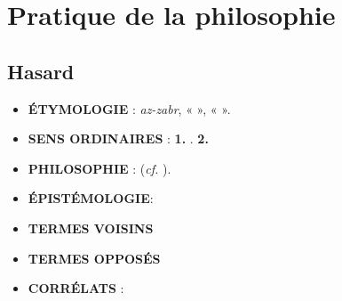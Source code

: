 
\section{Pratique de la philosophie}

\subsection{Hasard}

\begin{itemize}[leftmargin=1cm, label=, itemsep=1pt]
\item {\footnotesize \bf ÉTYMOLOGIE} : {\it az-zabr}, «  », «  ».
\item {\footnotesize \bf SENS ORDINAIRES} : {\bf 1.} . {\bf 2.} 
\item {\footnotesize \bf PHILOSOPHIE} :  ({\it cf.} ).
\item {\footnotesize \bf ÉPISTÉMOLOGIE}: 
\end{itemize}

\begin{itemize}[leftmargin=1cm, label=, itemsep=1pt]
\item {\footnotesize \bf TERMES VOISINS}
\item {\footnotesize \bf TERMES OPPOSÉS}
\item {\footnotesize \bf CORRÉLATS} : 
\end{itemize}

